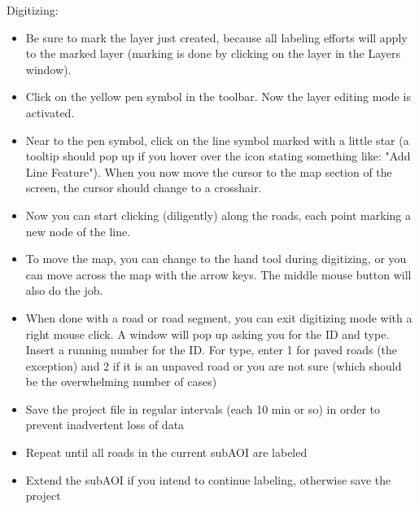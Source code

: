 \documentclass[12pt,a4paper]{scrartcl}
\begin{document}
Digitizing:
\begin{itemize}
	\item Be sure to mark the layer just created, because all labeling efforts will apply to the marked layer (marking is done by clicking on the layer in the Layers window). 
	\item Click on the yellow pen symbol in the toolbar. Now the layer editing mode is activated.
	\item Near to the pen symbol, click on the line symbol marked with a little star (a tooltip should pop up if you hover over the icon stating something like: "Add Line Feature").  
	When you now move the cursor to the map section of the screen, the cursor should change to a crosshair.
	\item Now you can start clicking (diligently) along the roads, each point marking a new node of the line. 
	\item To move the map, you can change to the hand tool during digitizing, or you can move across the map with the arrow keys. The middle mouse button will also do the job.
	\item When done with a road or road segment, you can exit digitizing mode with a right mouse click. A window will pop up asking you for the ID and type. Insert a running number for the ID. For type, enter 1 for paved roads (the exception) and 2 if it is an unpaved road or you are not sure (which should be the overwhelming number of cases)
	\item Save the project file in regular intervals (each 10 min or so) in order to prevent inadvertent loss of data
	\item Repeat until all roads in the current subAOI are labeled
	\item Extend the subAOI if you intend to continue labeling, otherwise save the project
\end{itemize}
\end{document}
